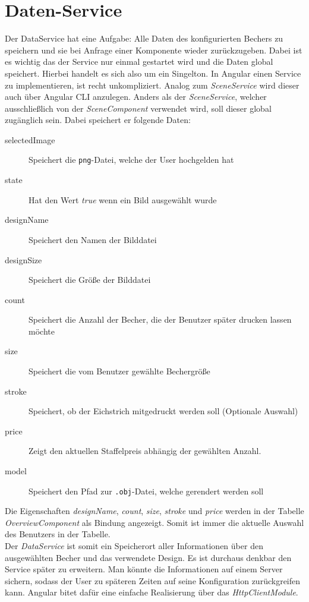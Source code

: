 \section{Daten-Service}
\label{sec:umsetzung}
%
Der DataService hat eine Aufgabe: Alle Daten des konfigurierten Bechers zu speichern und sie bei Anfrage einer Komponente wieder zurückzugeben. Dabei ist es wichtig das der Service nur einmal gestartet wird und die Daten global speichert. Hierbei handelt es sich also um ein Singelton. In Angular einen Service zu implementieren, ist recht unkompliziert. Analog zum \textit{SceneService} wird dieser auch über Angular CLI anzulegen. Anders als der \textit{SceneService}, welcher ausschließlich von der \textit{SceneComponent} verwendet wird, soll dieser global zugänglich sein. Dabei speichert er folgende Daten:
\begin{description}
	\item[selectedImage] Speichert die \texttt{png}-Datei, welche der User hochgelden hat
	\item[state] Hat den Wert \textit{true} wenn ein Bild ausgewählt wurde
	\item[designName] Speichert den Namen der Bilddatei
	\item[designSize] Speichert die Größe der Bilddatei
	\item[count] Speichert die Anzahl der Becher, die der Benutzer später drucken lassen möchte 
	\item[size] Speichert die vom Benutzer gewählte Bechergröße
	\item[stroke] Speichert, ob der Eichstrich mitgedruckt werden soll (Optionale Auswahl)
	\item[price] Zeigt den aktuellen Staffelpreis abhängig der gewählten Anzahl.
	\item[model] Speichert den Pfad zur \texttt{.obj}-Datei, welche gerendert werden soll
\end{description}
%
Die Eigenschaften \textit{designName}, \textit{count}, \textit{size}, \textit{stroke} und \textit{price} werden in der Tabelle \textit{OverviewComponent} als Bindung angezeigt. Somit ist immer die aktuelle Auswahl des Benutzers in der Tabelle. \\
Der \textit{DataService} ist somit ein Speicherort aller Informationen über den ausgewählten Becher und das verwendete Design. Es ist durchaus denkbar den Service später zu erweitern. Man könnte die Informationen auf einem Server sichern, sodass der User zu späteren Zeiten auf seine Konfiguration zurückgreifen kann. Angular bitet dafür eine einfache Realisierung über das \textit{HttpClientModule}.

